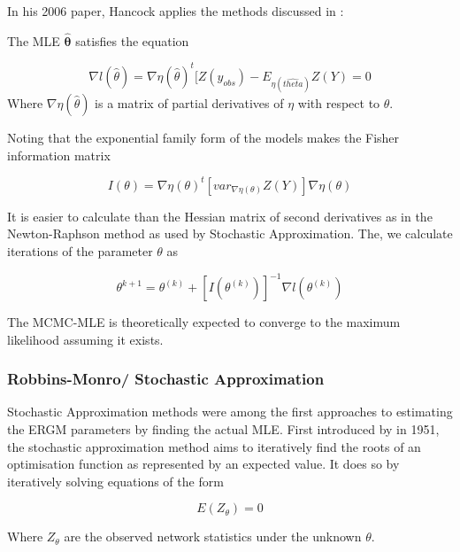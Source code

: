 In his 2006 paper, Hancock applies the methods discussed in \cite{geyerthompson1992}:

The MLE $\boldsymbol{\hat{\theta}}$ satisfies the equation

\begin{equation}
\nabla l(\hat{\theta}) = \nabla \eta(\hat{\theta})^t [Z(y_{obs}) - E_{\eta(\hat{theta})}Z(Y) = 0
\end{equation}
Where $\nabla \eta(\hat{\theta})$ is a matrix of partial derivatives of $\eta$ with respect to $\theta$.

Noting that the exponential family form of the models makes the Fisher information matrix 

\begin{equation}
I(\theta) = \nabla \eta(\theta)^t[var_{\nabla \eta(\theta)}Z(Y)]\nabla \eta(\theta)
\end{equation}

It is easier to calculate than the Hessian matrix of second derivatives as in the Newton-Raphson method as used by Stochastic Approximation. The, we calculate iterations of the parameter $\theta$ as

\begin{equation}
\theta^{k+1} = \theta^{(k)} + [I(\theta^(k))]^{-1} \nabla l(\theta^{(k)})
\end{equation}


The MCMC-MLE is theoretically expected to converge to the maximum likelihood assuming it exists.



\subsubsection{Robbins-Monro/ Stochastic Approximation}

Stochastic Approximation methods were among the first approaches to estimating the ERGM parameters by finding the actual MLE. First introduced by \citeauthor{robbinsmonro1951} in 1951, the stochastic approximation method aims to iteratively find the roots of an optimisation function as represented by an expected value. It does so by iteratively solving equations of the form 

\begin{equation}
E(Z_\theta) = 0
\end{equation}

Where $Z_\theta$ are the observed network statistics under the unknown $\theta$.

